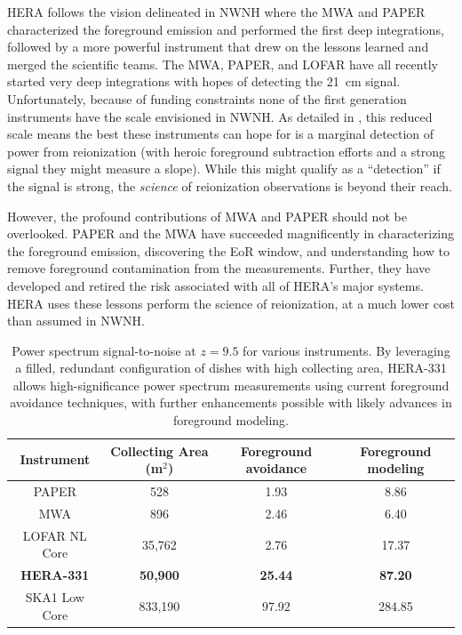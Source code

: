 \documentclass[preprint]{aastex}
\begin{document}
HERA follows the vision delineated in NWNH where the MWA and PAPER characterized the foreground emission and performed the first deep integrations, followed by a more powerful instrument that drew on the lessons learned and merged the scientific teams. The MWA, PAPER, and LOFAR have all recently started very deep integrations with hopes of detecting the 21~cm signal. Unfortunately, because of funding constraints none of the first generation instruments have the scale envisioned in NWNH. As detailed in \cite{Jonnie}, this reduced scale means the best these instruments can hope for is a marginal detection of power from reionization (with heroic foreground subtraction efforts and a strong signal they might measure a slope). While this might qualify as a ``detection'' if the signal is strong, the \emph{science} of reionization observations is beyond their reach. 

However, the profound contributions of MWA and PAPER should not be overlooked. PAPER and the MWA have succeeded magnificently in characterizing the foreground emission, discovering the EoR window, and understanding how to remove foreground contamination from the measurements. Further, they have developed and retired the risk associated with all of HERA's major systems. 
HERA uses these lessons perform the science of reionization, at a much lower cost than assumed in NWNH.

\begin{table}
\centering
\begin{tabular}{c||c||c|c} 
Instrument & Collecting Area (m$^2$) & Foreground avoidance & Foreground modeling \\
\hline
PAPER & 528 & 1.93 & 8.86 \\
MWA & 896 & 2.46 & 6.40 \\
LOFAR NL Core & 35,762 & 2.76 & 17.37 \\
\textbf{HERA-331} & \textbf{50,900} & \textbf{25.44} & \textbf{87.20} \\
SKA1 Low Core & 833,190 & 97.92 & 284.85 \\
\end{tabular}
\caption{Power spectrum signal-to-noise at $z=9.5$ for various instruments.  By leveraging a filled, redundant configuration of dishes with high collecting area, HERA-331 allows high-significance power spectrum measurements using current foreground avoidance techniques, with further enhancements possible with likely advances in foreground modeling.}
\label{tab:signif}
\end{table}
\end{document}
